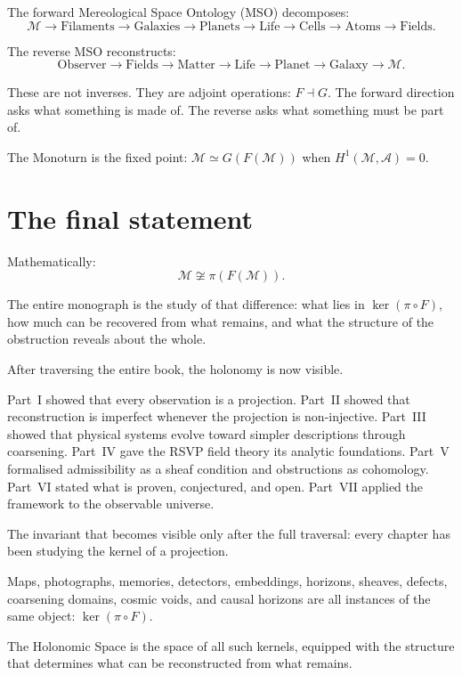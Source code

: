 The forward Mereological Space Ontology (MSO) decomposes:
\[
  \mathcal{M}
  \to \text{Filaments}
  \to \text{Galaxies}
  \to \text{Planets}
  \to \text{Life}
  \to \text{Cells}
  \to \text{Atoms}
  \to \text{Fields}.
\]

The reverse MSO reconstructs:
\[
  \text{Observer}
  \to \text{Fields}
  \to \text{Matter}
  \to \text{Life}
  \to \text{Planet}
  \to \text{Galaxy}
  \to \mathcal{M}.
\]

These are not inverses. They are adjoint operations:
$F \dashv G$.
The forward direction asks what something is made of.
The reverse asks what something must be part of.

The Monoturn is the fixed point:
$\mathcal{M} \simeq G(F(\mathcal{M}))$
when $H^1(\mathcal{M}, \mathcal{A}) = 0$.

\section{The final statement}


Mathematically:
\[
  \boxed{\mathcal{M} \not\cong \pi(F(\mathcal{M})).}
\]

The entire monograph is the study of that difference:
what lies in $\ker(\pi \circ F)$, how much can be recovered
from what remains, and what the structure of the obstruction
reveals about the whole.

\begin{HolonomyNote}
  After traversing the entire book, the holonomy is now visible.

  Part~I showed that every observation is a projection.
  Part~II showed that reconstruction is imperfect whenever
  the projection is non-injective.
  Part~III showed that physical systems evolve toward simpler
  descriptions through coarsening.
  Part~IV gave the RSVP field theory its analytic foundations.
  Part~V formalised admissibility as a sheaf condition and
  obstructions as cohomology.
  Part~VI stated what is proven, conjectured, and open.
  Part~VII applied the framework to the observable universe.

  The invariant that becomes visible only after the full
  traversal: every chapter has been studying the kernel of a
  projection.

  Maps, photographs, memories, detectors, embeddings, horizons,
  sheaves, defects, coarsening domains, cosmic voids, and
  causal horizons are all instances of the same object:
  $\ker(\pi \circ F)$.

  The Holonomic Space is the space of all such kernels,
  equipped with the structure that determines what can be
  reconstructed from what remains.
\end{HolonomyNote}

